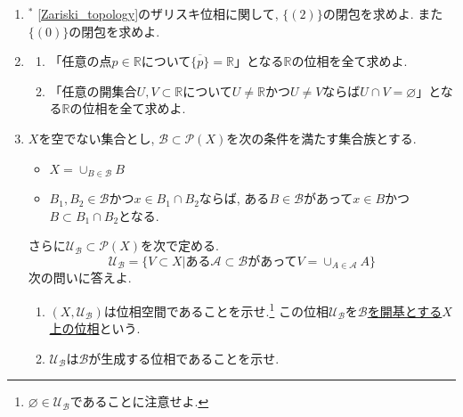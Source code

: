 \documentclass[dvipdfmx,a4paper,11pt]{article}
\newcommand{\R}{\mathbb{R}}
\theoremstyle{definition}
\begin{document}
\begin{enumerate}[label=\textbf{問}\ref*{sec-subspace}.\arabic*]
\item $^{*}$ \ref{Zariski_topology}のザリスキ位相に関して, $\{ (2) \}$の閉包を求めよ. また$\{ (0) \}$の閉包を求めよ.

\item 
\begin{enumerate}
	\setlength{\parskip}{0cm}
  \setlength{\itemsep}{0pt} 
	\item  「任意の点$p \in \R$について$\overline{\{p\}} =\R$」となる$\R$の位相を全て求めよ. 
	\item  「任意の開集合$U,V \subset \R$について$U \neq \R$かつ$U \neq V$ならば$U \cap V = \varnothing$」となる$\R$の位相を全て求めよ. 
	\end{enumerate}

\newpage 
\item\label{basis_topology}
$X$を空でない集合とし, $\mathscr{B}\subset \mathcal{P}(X)$を次の条件を満たす集合族とする.
\begin{itemize}
 \setlength{\parskip}{0cm} 
  \setlength{\itemsep}{0cm} 
\item $X = \cup_{B \in \mathscr{B} }B$
\item $B_1, B_2\in \mathscr{B} $かつ$x \in B_1\cap B_2$ならば, ある$B \in \mathscr{B}$があって$x\in B$かつ$B \subset B_1\cap B_2$となる.
\end{itemize}
さらに$ \mathscr{U}_{\mathscr{B}} \subset \mathcal{P}(X)$を次で定める.
$$ \mathscr{U}_{\mathscr{B}} = \{ V\subset X | \text{ある$\mathscr{A} \subset \mathscr{B}$があって$V=\cup_{A \in \mathscr{A}}A$}  \}$$
次の問いに答えよ.
\begin{enumerate}
	\setlength{\parskip}{0cm} 
  \setlength{\itemsep}{0cm} 
\item $(X,\mathscr{U}_{\mathscr{B}} )$は位相空間であることを示せ.\footnote{$\varnothing \in \mathscr{U}_{\mathscr{B}}$であることに注意せよ.} この位相$\mathscr{U}_{\mathscr{B}} $を\underline{$\mathscr{B}$を開基とする$X$上の位相}という. 
\item $\mathscr{U}_{\mathscr{B}}$は$\mathscr{B}$が生成する位相であることを示せ.
\end{enumerate}




\end{enumerate}
\end{document}
